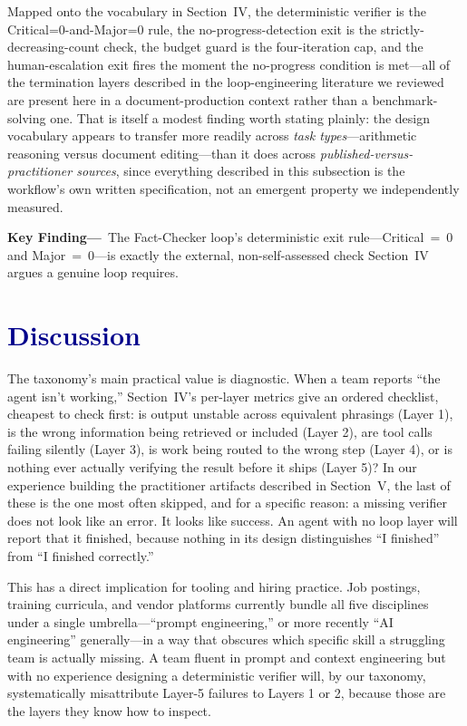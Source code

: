\documentclass[journal]{IEEEtran}
\begin{document}
Mapped onto the vocabulary in Section~IV, the deterministic verifier is the Critical=0-and-Major=0 rule, the no-progress-detection exit is the strictly-decreasing-count check, the budget guard is the four-iteration cap, and the human-escalation exit fires the moment the no-progress condition is met---all of the termination layers described in the loop-engineering literature we reviewed are present here in a document-production context rather than a benchmark-solving one. That is itself a modest finding worth stating plainly: the design vocabulary appears to transfer more readily across \emph{task types}---arithmetic reasoning versus document editing---than it does across \emph{published-versus-practitioner sources}, since everything described in this subsection is the workflow's own written specification, not an emergent property we independently measured.

\begin{mdframed}[linecolor=loopclr, linewidth=1.2pt, backgroundcolor=loopclr!6,
  innerleftmargin=8pt, innerrightmargin=8pt, innertopmargin=6pt, innerbottommargin=6pt,
  roundcorner=4pt]
\noindent\textbf{\textcolor{loopclr}{Key Finding---}}~The Fact-Checker loop's deterministic exit rule---Critical~=~0 and Major~=~0---is exactly the external, non-self-assessed check Section~IV argues a genuine loop requires.
\end{mdframed}

\section{\textcolor{darkblue}{Discussion}}

The taxonomy's main practical value is diagnostic. When a team reports ``the agent isn't working,'' Section~IV's per-layer metrics give an ordered checklist, cheapest to check first: is output unstable across equivalent phrasings (Layer 1), is the wrong information being retrieved or included (Layer 2), are tool calls failing silently (Layer 3), is work being routed to the wrong step (Layer 4), or is nothing ever actually verifying the result before it ships (Layer 5)? In our experience building the practitioner artifacts described in Section~V, the last of these is the one most often skipped, and for a specific reason: a missing verifier does not look like an error. It looks like success. An agent with no loop layer will report that it finished, because nothing in its design distinguishes ``I finished'' from ``I finished correctly.''

This has a direct implication for tooling and hiring practice. Job postings, training curricula, and vendor platforms currently bundle all five disciplines under a single umbrella---``prompt engineering,'' or more recently ``AI engineering'' generally---in a way that obscures which specific skill a struggling team is actually missing. A team fluent in prompt and context engineering but with no experience designing a deterministic verifier will, by our taxonomy, systematically misattribute Layer-5 failures to Layers 1 or 2, because those are the layers they know how to inspect.
\end{document}
